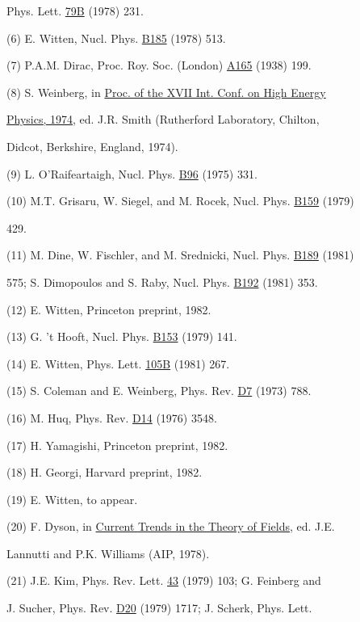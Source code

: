 \hspace*{1.6em} Phys. Lett. \underline{79B} (1978) 231.

(6) E. Witten, Nucl. Phys. \underline{B185} (1978) 513.

(7) P.A.M. Dirac, Proc. Roy. Soc. (London) \underline{A165} (1938) 199.

(8) S. Weinberg, in \underline{Proc. of the XVII Int. Conf. on High Energy}

\hspace*{1.6em} \underline{Physics, 1974}, ed. J.R. Smith (Rutherford Laboratory, Chilton,

\hspace*{1.6em} Didcot, Berkshire, England, 1974).

(9) L. O'Raifeartaigh, Nucl. Phys. \underline{B96} (1975) 331.

(10) M.T. Grisaru, W. Siegel, and M. Rocek, Nucl. Phys. \underline{B159} (1979)

\hspace*{1.6em} 429.

(11) M. Dine, W. Fischler, and M. Srednicki, Nucl. Phys. \underline{B189} (1981)

\hspace*{1.6em} 575; S. Dimopoulos and S. Raby, Nucl. Phys. \underline{B192} (1981) 353.

(12) E. Witten, Princeton preprint, 1982.

(13) G. 't Hooft, Nucl. Phys. \underline{B153} (1979) 141.

(14) E. Witten, Phys. Lett. \underline{105B} (1981) 267.

(15) S. Coleman and E. Weinberg, Phys. Rev. \underline{D7} (1973) 788.

(16) M. Huq, Phys. Rev. \underline{D14} (1976) 3548.

(17) H. Yamagishi, Princeton preprint, 1982.

(18) H. Georgi, Harvard preprint, 1982.

(19) E. Witten, to appear.

(20) F. Dyson, in \underline{Current Trends in the Theory of Fields}, ed. J.E.

\hspace*{1.6em} Lannutti and P.K. Williams (AIP, 1978).

(21) J.E. Kim, Phys. Rev. Lett. \underline{43} (1979) 103; G. Feinberg and

\hspace*{1.6em} J. Sucher, Phys. Rev. \underline{D20} (1979) 1717; J. Scherk, Phys. Lett.

